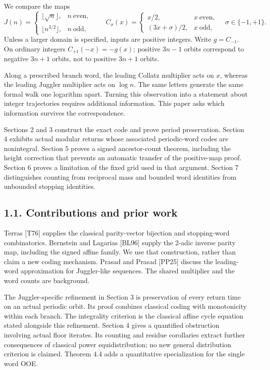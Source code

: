 \documentclass[11pt,a4paper]{article}
\begin{document}
We compare the maps \[
J(n)=
\begin{cases}
\lfloor\sqrt n\rfloor,&n\ \text{even},\\
\lfloor n^{3/2}\rfloor,&n\ \text{odd},
\end{cases}
\qquad
C_\sigma(x)=
\begin{cases}
x/2,&x\ \text{even},\\
(3x+\sigma)/2,&x\ \text{odd},
\end{cases}
\quad \sigma\in\{-1,+1\}.
\] Unless a larger domain is specified, inputs are positive integers.
Write \(g=C_{-1}\). On ordinary integers \(C_{+1}(-x)=-g(x)\); positive
\(3n-1\) orbits correspond to negative \(3n+1\) orbits, not to positive
\(3n+1\) orbits.

Along a prescribed branch word, the leading Collatz multiplier acts on
\(x\), whereas the leading Juggler multiplier acts on \(\log n\). The
same letters generate the same formal walk one logarithm apart. Turning
this observation into a statement about integer trajectories requires
additional information. This paper asks which information survives the
correspondence.

Sections 2 and 3 construct the exact code and prove period preservation.
Section 4 exhibits actual modular returns whose associated periodic-word
codes are nonintegral. Section 5 proves a signed ancestor-count theorem,
including the height correction that prevents an automatic transfer of
the positive-map proof. Section 6 proves a limitation of the fixed grid
used in that argument. Section 7 distinguishes counting from reciprocal
mass and bounded word identities from unbounded stopping identities.

\subsection{1.1. Contributions and prior
work}\label{contributions-and-prior-work}

Terras {[}T76{]} supplies the classical parity-vector bijection and
stopping-word combinatorics. Bernstein and Lagarias {[}BL96{]} supply
the 2-adic inverse parity map, including the signed affine family. We
use that construction, rather than claim a new coding mechanism. Prasad
and Prasad {[}PP25{]} discuss the leading-word approximation for
Juggler-like sequences. The shared multiplier and the word counts are
background.

The Juggler-specific refinement in Section 3 is preservation of every
return time on an actual periodic orbit. Its proof combines classical
coding with monotonicity within each branch. The integrality criterion
is the classical affine cycle equation stated alongside this refinement.
Section 4 gives a quantified obstruction involving actual floor
iterates. Its counting and residue corollaries extract further
consequences of classical power equidistribution; no new general
distribution criterion is claimed. Theorem 4.4 adds a quantitative
specialization for the single word OOE.
\end{document}
